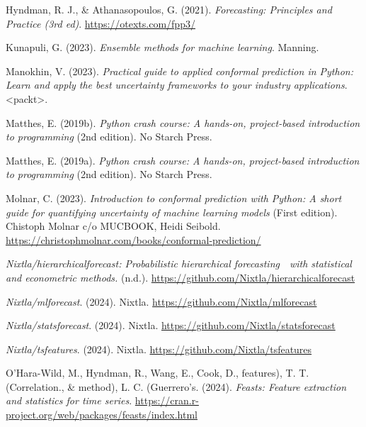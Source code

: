 \documentclass[
  american,
  10,
  a4paper,
]{book}
\newlength{\cslhangindent}
\newenvironment{CSLReferences}[2] %
 {\begin{list}{}{%
  \setlength{\itemindent}{0pt}
  \setlength{\leftmargin}{0pt}
  \setlength{\parsep}{0pt}
  \ifodd #1
   \setlength{\leftmargin}{\cslhangindent}
   \setlength{\itemindent}{-1\cslhangindent}
  \fi
  \setlength{\itemsep}{#2\baselineskip}}}
 {\end{list}}
\theoremstyle{definition}
\theoremstyle{remark}
\begin{document}
\begin{CSLReferences}{1}{0}
Hyndman, R. J., \& Athanasopoulos, G. (2021). \emph{Forecasting:
{Principles} and {Practice} (3rd ed)}. \url{https://otexts.com/fpp3/}

Kunapuli, G. (2023). \emph{Ensemble methods for machine learning}.
Manning.

Manokhin, V. (2023). \emph{Practical guide to applied conformal
prediction in {Python}: Learn and apply the best uncertainty frameworks
to your industry applications}. {\textless{}}packt{\textgreater{}}.

Matthes, E. (2019b). \emph{Python crash course: A hands-on,
project-based introduction to programming} (2nd edition). No Starch
Press.

Matthes, E. (2019a). \emph{Python crash course: A hands-on,
project-based introduction to programming} (2nd edition). No Starch
Press.

Molnar, C. (2023). \emph{Introduction to conformal prediction with
{Python}: A short guide for quantifying uncertainty of machine learning
models} (First edition). Chistoph Molnar c/o MUCBOOK, Heidi Seibold.
\url{https://christophmolnar.com/books/conformal-prediction/}

\emph{Nixtla/hierarchicalforecast: Probabilistic hierarchical
forecasting 👑 with statistical and econometric methods.} (n.d.).
\url{https://github.com/Nixtla/hierarchicalforecast}

\emph{Nixtla/mlforecast}. (2024). Nixtla.
\url{https://github.com/Nixtla/mlforecast}

\emph{Nixtla/statsforecast}. (2024). Nixtla.
\url{https://github.com/Nixtla/statsforecast}

\emph{Nixtla/tsfeatures}. (2024). Nixtla.
\url{https://github.com/Nixtla/tsfeatures}

O'Hara-Wild, M., Hyndman, R., Wang, E., Cook, D., features), T. T.
(Correlation., \& method), L. C. (Guerrero's. (2024). \emph{Feasts:
Feature extraction and statistics for time series}.
\url{https://cran.r-project.org/web/packages/feasts/index.html}


\end{CSLReferences}
\end{document}
